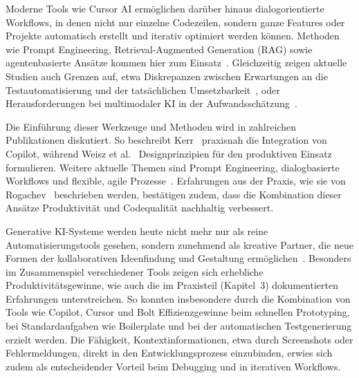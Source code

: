 Moderne Tools wie Cursor AI ermöglichen darüber hinaus dialogorientierte
Workflows, in denen nicht nur einzelne Codezeilen, sondern ganze Features oder
Projekte automatisch erstellt und iterativ optimiert werden können. Methoden
wie Prompt Engineering, Retrieval-Augmented Generation (RAG) sowie
agentenbasierte Ansätze kommen hier zum
Einsatz~\cite{esposito_generative_2025}. Gleichzeitig zeigen aktuelle Studien
auch Grenzen auf, etwa Diskrepanzen zwischen Erwartungen an die
Testautomatisierung und der tatsächlichen
Umsetzbarkeit~\cite{karhu_expectations_2025}, oder Herausforderungen bei
multimodaler KI in der Aufwandsschätzung~\cite{islam_multimodal_2025}.

Die Einführung dieser Werkzeuge und Methoden wird in zahlreichen Publikationen
diskutiert. So beschreibt Kerr~\cite{kerr_github_nodate} praxisnah die
Integration von Copilot, während Weisz et al.~\cite{weisz_design_2024}
Designprinzipien für den produktiven Einsatz formulieren. Weitere aktuelle
Themen sind Prompt Engineering, dialogbasierte Workflows und flexible, agile
Prozesse~\cite{nguyen-duc_generative_2023,gill_agile_2025}. Erfahrungen aus der
Praxis, wie sie von Rogachev~\cite{rogachev_my_nodate} beschrieben werden,
bestätigen zudem, dass die Kombination dieser Ansätze Produktivität und
Codequalität nachhaltig verbessert.

Generative KI-Systeme werden heute nicht mehr nur als reine
Automatisierungstools gesehen, sondern zunehmend als kreative Partner, die neue
Formen der kollaborativen Ideenfindung und Gestaltung
ermöglichen~\cite{khan_beyond_2025}. Besonders im Zusammenspiel verschiedener
Tools zeigen sich erhebliche Produktivitätsgewinne, wie auch die im Praxisteil
(Kapitel~3) dokumentierten Erfahrungen unterstreichen. So konnten insbesondere
durch die Kombination von Tools wie Copilot, Cursor und Bolt Effizienzgewinne
beim schnellen Prototyping, bei Standardaufgaben wie Boilerplate und bei der
automatischen Testgenerierung erzielt werden. Die Fähigkeit,
Kontextinformationen, etwa durch Screenshots oder Fehlermeldungen, direkt in
den Entwicklungsprozess einzubinden, erwies sich zudem als entscheidender
Vorteil beim Debugging und in iterativen Workflows.

